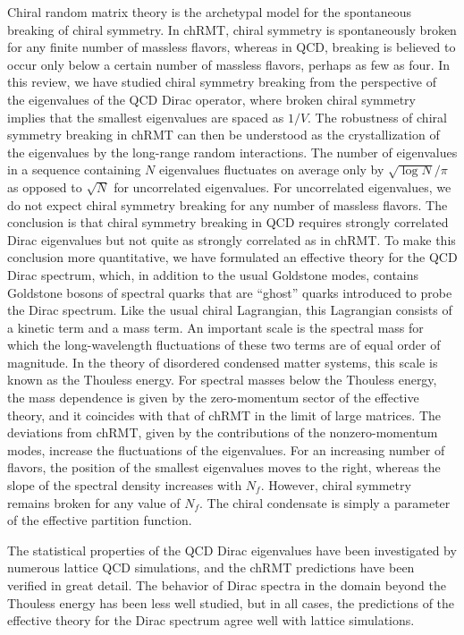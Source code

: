 Chiral random matrix theory is the archetypal model for the
spontaneous breaking of chiral symmetry.  In chRMT, chiral symmetry is
spontaneously broken for any finite number of massless flavors, whereas
in QCD, breaking is believed to occur only below a certain
number of massless flavors, perhaps as few as four.  In this
review, we have studied chiral symmetry breaking from the perspective
of the eigenvalues of the QCD Dirac operator, where broken chiral
symmetry implies that the smallest eigenvalues are spaced as $1/V$.
The robustness of chiral symmetry breaking in chRMT can then be
understood as the crystallization of the eigenvalues by the long-range
random interactions.  The number of eigenvalues in a sequence
containing $N$ eigenvalues fluctuates on average only by $\sqrt{\log
  N}/\pi$ as opposed to $\sqrt N$ for uncorrelated eigenvalues. For
uncorrelated eigenvalues, we do not expect chiral symmetry breaking for
any number 
of massless flavors.  The conclusion is that chiral symmetry breaking
in QCD requires strongly correlated Dirac eigenvalues but not quite
as strongly correlated as in chRMT. To make this conclusion more
quantitative, we 
have formulated an effective theory for the QCD Dirac spectrum, which,
in addition to the usual Goldstone modes, contains Goldstone bosons of
spectral quarks that are ``ghost'' quarks introduced to probe the
Dirac spectrum.  Like the usual chiral Lagrangian, this
Lagrangian consists of a kinetic term and a mass term. An important
scale is the spectral mass for which the long-wavelength fluctuations
of these two terms are of equal order of magnitude. In the theory of
disordered condensed matter systems, this scale is known as the
Thouless energy.  For spectral masses below the Thouless energy, the
mass dependence is given by the zero-momentum sector of the effective
theory, and it coincides with that of chRMT in the limit of large
matrices.  The deviations from chRMT, given by the contributions of
the nonzero-momentum modes, increase the fluctuations of the
eigenvalues. For an increasing number of flavors, the position of the
smallest eigenvalues moves to the right, whereas the slope of the spectral
density increases with $N_f$.  However, chiral symmetry remains
broken for any value of $N_f$. The chiral condensate is simply a
parameter of the effective partition function.

The statistical properties of the QCD Dirac eigenvalues have been
investigated by numerous lattice QCD simulations, and the chRMT
predictions have been verified in great detail. The behavior of Dirac
spectra in the domain beyond the Thouless energy has been less well
studied, but in all cases, the predictions of the
effective theory for the Dirac spectrum agree well with lattice
simulations. 

